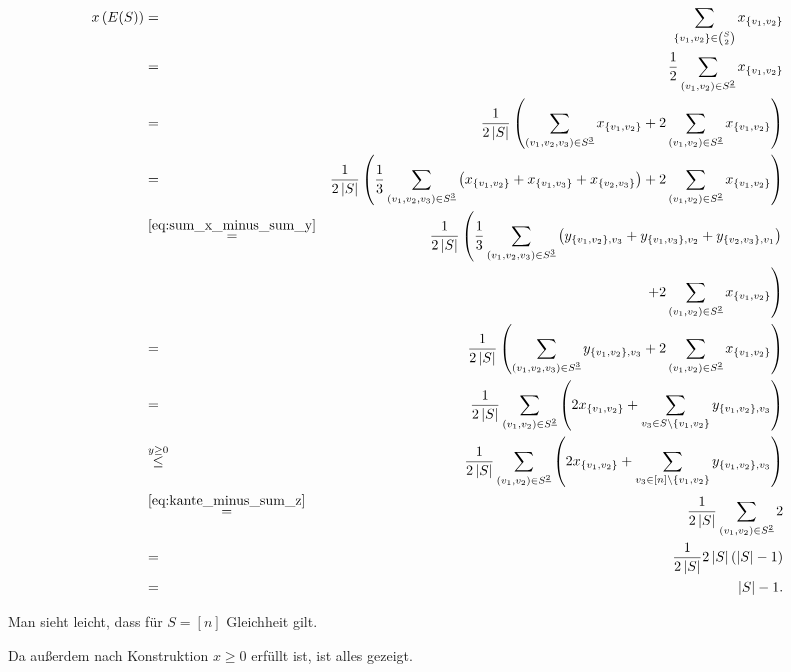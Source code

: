 \documentclass[10p,a4paper,BCOR = 12mm, DIV=15]{scrbook}
\begin{document}
\begin{bew}
{
\allowdisplaybreaks
\begin{eqnarray*}
x\left(E(S)\right) & = & \sum_{\left\{v_1, v_2\right\}\in {S \choose 2}} x_{\left\{v_1, v_2\right\}} \\
& = & \frac{1}{2} \sum_{\left(v_1, v_2\right)\in S^{\underline{2}}} x_{\left\{v_1, v_2\right\}} \\
& = & \frac{1}{2 \left|S\right|} \left( \sum_{\left(v_1, v_2, v_3\right)\in S^{\underline{3}}} x_{\left\{v_1, v_2\right\}} + 2 \sum_{\left(v_1, v_2\right) \in S^{\underline{2}}} x_{\left\{v_1, v_2\right\}} \right) \\
& = & \frac{1}{2 \left|S\right|} \left(\frac{1}{3} \sum_{\left(v_1, v_2, v_3\right) \in S^{\underline{3}}} \left(x_{\left\{v_1, v_2\right\}} + x_{\left\{v_1, v_3\right\}} + x_{\left\{v_2, v_3\right\}}\right) + 2 \sum_{\left(v_1, v_2\right) \in S^{\underline{2}}} x_{\left\{v_1, v_2\right\}} \right) \\
& \stackrel{\eqref{eq:sum_x_minus_sum_y}}{=} & \frac{1}{2 \left|S\right|} \left(\frac{1}{3} \sum_{\left(v_1, v_2, v_3\right)\in S^{\underline{3}}} \left(y_{\left\{v_1, v_2\right\}, v_3} + y_{\left\{v_1, v_3\right\}, v_2} + y_{\left\{v_2, v_3\right\}, v_1}\right) \right. \\
& & \left.+ 2 \sum_{\left(v_1, v_2\right) \in S^{\underline{2}}} x_{\left\{v_1, v_2\right\}} \right) \\
& = & \frac{1}{2 \left|S\right|} \left(\sum_{\left(v_1, v_2, v_3\right) \in S^{\underline{3}}} y_{\left\{v_1, v_2\right\}, v_3} + 2 \sum_{\left(v_1, v_2\right)\in S^{\underline{2}}} x_{\left\{v_1, v_2\right\}} \right) \\
& = & \frac{1}{2 \left|S\right|} \sum_{\left(v_1, v_2\right) \in S^{\underline{2}}} \left(
2 x_{\left\{v_1, v_2\right\}} + 
\sum_{v_3\in S \backslash \left\{v_1, v_2\right\}} y_{\left\{v_1, v_2\right\}, v_3} \right) \\
& \stackrel{y\geq 0}{\leq} & \frac{1}{2 \left|S\right|} \sum_{\left(v_1, v_2\right) \in S^{\underline{2}}} \left(
2 x_{\left\{v_1, v_2\right\}} + 
\sum_{v_3\in \left[n\right] \backslash \left\{v_1, v_2\right\}} y_{\left\{v_1, v_2\right\}, v_3} \right) \\
& \stackrel{\eqref{eq:kante_minus_sum_z}}{=} & \frac{1}{2 \left|S\right|} \sum_{\left(v_1, v_2\right) \in S^{\underline{2}}} 2 \\
& = & \frac{1}{2 \left|S\right|} 2 \left|S\right| \left(\left|S\right|-1\right)\\
& = & \left|S\right|-1.
\end{eqnarray*}
}

Man sieht leicht, dass für $S=\left[n\right]$ Gleichheit gilt.

Da außerdem nach Konstruktion $x\geq 0$ erfüllt ist, ist alles gezeigt.
\end{bew}
\end{document}

